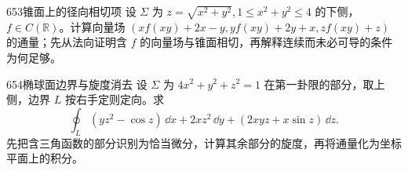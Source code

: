 \begin{exercise}{653}{锥面上的径向相切项}
设 $\Sigma$ 为 $z=\sqrt{x^2+y^2},1\le x^2+y^2\le4$ 的下侧，$f\in C(\mathbb R)$。计算向量场 $(xf(xy)+2x-y,yf(xy)+2y+x,zf(xy)+z)$ 的通量；先从法向证明含 $f$ 的向量场与锥面相切，再解释连续而未必可导的条件为何足够。
\end{exercise}
\begin{exercise}{654}{椭球面边界与旋度消去}
设 $\Sigma$ 为 $4x^2+y^2+z^2=1$ 在第一卦限的部分，取上侧，边界 $L$ 按右手定则定向。求
\[\oint_L(yz^2-\cos z)\,\dd x+2xz^2\,\dd y+(2xyz+x\sin z)\,\dd z.\]
先把含三角函数的部分识别为恰当微分，计算其余部分的旋度，再将通量化为坐标平面上的积分。
\end{exercise}
